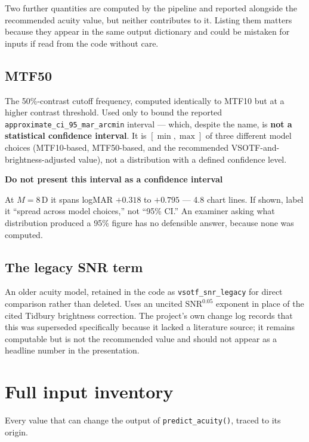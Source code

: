 \documentclass[11pt]{report}
\newenvironment{warnbox}[1]%
{\par\vspace{6pt}\begin{lrbox}{\wbsave}\begin{minipage}{0.88\textwidth}%
{\bfseries\color{warnred}#1}\par\vspace{4pt}\ignorespaces}%
{\end{minipage}\end{lrbox}%
\begin{center}\setlength{\fboxrule}{1.2pt}\setlength{\fboxsep}{7pt}%
\fcolorbox{warnred}{white}{\usebox{\wbsave}}\end{center}\vspace{6pt}\par}
\begin{document}
Two further quantities are computed by the pipeline and reported alongside the recommended acuity
value, but neither contributes to it. Listing them matters because they appear in the same output
dictionary and could be mistaken for inputs if read from the code without care.

\section{MTF50}

The 50\%-contrast cutoff frequency, computed identically to MTF10 but at a higher contrast threshold.
Used only to bound the reported \texttt{approximate\_ci\_95\_mar\_arcmin} interval --- which, despite
the name, is \textbf{not a statistical confidence interval}. It is
$[\min, \max]$ of three different model choices (MTF10-based, MTF50-based, and the recommended
VSOTF-and-brightness-adjusted value), not a distribution with a defined confidence level.

\begin{warnbox}{Do not present this interval as a confidence interval}
At $M=8$\,D it spans logMAR $+0.318$ to $+0.795$ --- 4.8 chart lines. If shown, label it ``spread
across model choices,'' not ``95\% CI.'' An examiner asking what distribution produced a 95\% figure
has no defensible answer, because none was computed.
\end{warnbox}

\section{The legacy SNR term}

An older acuity model, retained in the code as \texttt{vsotf\_snr\_legacy} for direct comparison
rather than deleted. Uses an uncited $\text{SNR}^{0.05}$ exponent in place of the cited Tidbury
brightness correction. The project's own change log records that this was superseded specifically
because it lacked a literature source; it remains computable but is not the recommended value and
should not appear as a headline number in the presentation.

\chapter{Full input inventory}

Every value that can change the output of \texttt{predict\_acuity()}, traced to its origin.
\end{document}
